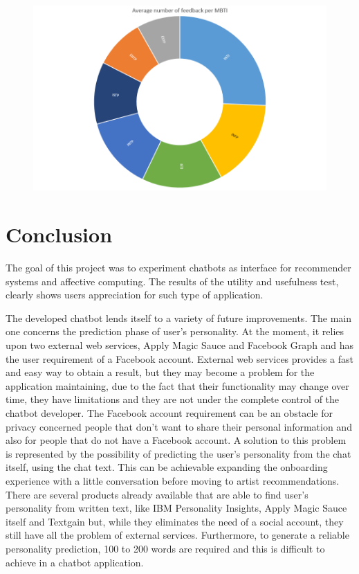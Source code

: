 \documentclass[b5paper,10pt,twoside,cucitura]{toptesi}
\begin{document}
\begin{figure}[ht]
\centering
\includegraphics[scale=0.4]{average.png}
\end{figure}


\chapter{Conclusion}

The goal of this project was to experiment chatbots as interface for recommender systems and affective computing. The results of the utility and usefulness test, clearly shows users appreciation for such type of application.

The developed chatbot lends itself to a variety of future improvements. The main one concerns the prediction phase of user's personality. At the moment, it relies upon two external web services, Apply Magic Sauce and Facebook Graph and has the user requirement of a Facebook account. External web services provides a fast and easy way to obtain a result, but they may become a problem for the application maintaining, due to the fact that their functionality may change over time, they have limitations and they are not under the complete control of the chatbot developer. The Facebook account requirement can be an obstacle for privacy concerned people that don't want to share their personal information and also for people that do not have a Facebook account. A solution to this problem is represented by the possibility of predicting the user's personality from the chat itself, using the chat text. This can be achievable expanding the onboarding experience with a little conversation before moving to artist recommendations. There are several products already available that are able to find user's personality from written text, like IBM Personality Insights, Apply Magic Sauce itself and Textgain but, while they eliminates the need of a social account, they still have all the problem of external services. Furthermore, to generate a reliable personality prediction, 100 to 200 words are required and this is difficult to achieve in a chatbot application.
\end{document}
